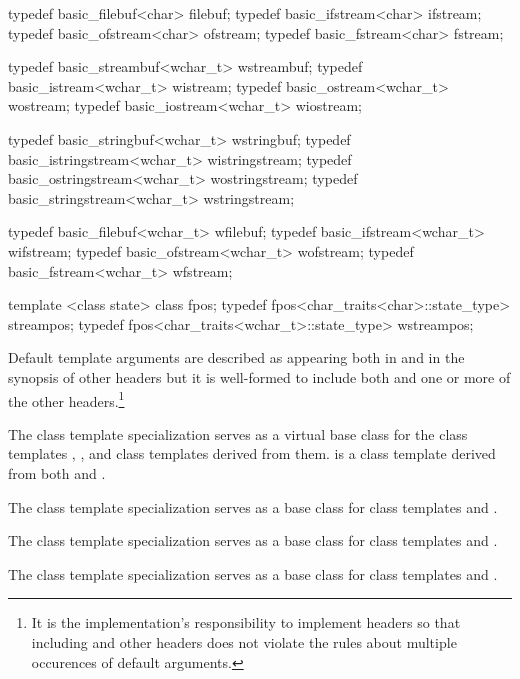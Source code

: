 \begin{codeblock}
{  typedef basic_filebuf<char>  filebuf;
  typedef basic_ifstream<char> ifstream;
  typedef basic_ofstream<char> ofstream;
  typedef basic_fstream<char>  fstream;

  typedef basic_streambuf<wchar_t> wstreambuf;
  typedef basic_istream<wchar_t>   wistream;
  typedef basic_ostream<wchar_t>   wostream;
  typedef basic_iostream<wchar_t>  wiostream;

  typedef basic_stringbuf<wchar_t>     wstringbuf;
  typedef basic_istringstream<wchar_t> wistringstream;
  typedef basic_ostringstream<wchar_t> wostringstream;
  typedef basic_stringstream<wchar_t>  wstringstream;

  typedef basic_filebuf<wchar_t>  wfilebuf;
  typedef basic_ifstream<wchar_t> wifstream;
  typedef basic_ofstream<wchar_t> wofstream;
  typedef basic_fstream<wchar_t>  wfstream;

  template <class state> class fpos;
  typedef fpos<char_traits<char>::state_type>    streampos;
  typedef fpos<char_traits<wchar_t>::state_type> wstreampos;
}
\end{codeblock}

\pnum
Default template arguments are described as appearing both in
and in the synopsis of other headers
but it is well-formed to include both
and one or more of the other headers.\footnote{It is the implementation's
responsibility to implement headers so
that including
and other headers does not violate the rules about
multiple occurences of default arguments.}

\pnum
\enternote
The
class template specialization
serves as a virtual base class for the
class templates
,
,
and
class templates
derived from them.
is a class
template
derived from both
and
.

\pnum
The
class template specialization
serves as a base class for class templates
and
.

\pnum
The
class template specialization
serves as a base class for class templates
and
.

\pnum
The
class template specialization
serves as a base class for class templates
and
.

